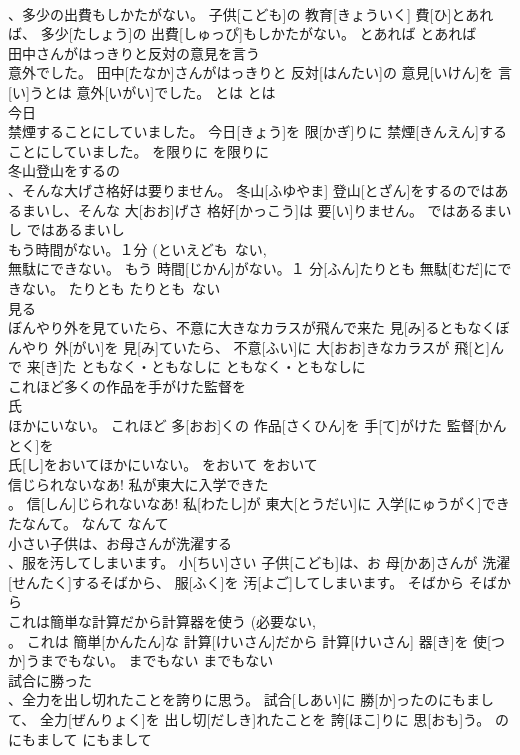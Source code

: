\documentclass[8pt]{extreport}
\begin{document}
\begin{CJK}{UTF8}{min}
\\	、多少の出費もしかたがない。	子供[こども]の 教育[きょういく] 費[ひ]とあれば、 多少[たしょう]の 出費[しゅっぴ]もしかたがない。	とあれば	とあれば	
\\	田中さんがはっきりと反対の意見を言う 
\\	意外でした。	田中[たなか]さんがはっきりと 反対[はんたい]の 意見[いけん]を 言[い]うとは 意外[いがい]でした。	とは	とは	
\\	今日 
\\	禁煙することにしていました。	今日[きょう]を 限[かぎ]りに 禁煙[きんえん]することにしていました。	を限りに	を限りに	
\\	冬山登山をするの 
\\	、そんな大げさ格好は要りません。	冬山[ふゆやま] 登山[とざん]をするのではあるまいし、そんな 大[おお]げさ 格好[かっこう]は 要[い]りません。	ではあるまいし	ではあるまいし	
\\	もう時間がない。１分 (といえども~ない, 
\\	無駄にできない。	もう 時間[じかん]がない。１ 分[ふん]たりとも 無駄[むだ]にできない。	たりとも	たりとも~ない	
\\	見る 
\\	ぼんやり外を見ていたら、不意に大きなカラスが飛んで来た	見[み]るともなくぼんやり 外[がい]を 見[み]ていたら、 不意[ふい]に 大[おお]きなカラスが 飛[と]んで 来[き]た	ともなく・ともなしに	ともなく・ともなしに	
\\	これほど多くの作品を手がけた監督を
\\	氏 
\\	ほかにいない。	これほど 多[おお]くの 作品[さくひん]を 手[て]がけた 監督[かんとく]を 
\\	氏[し]をおいてほかにいない。	をおいて	をおいて	
\\	信じられないなあ! 私が東大に入学できた 
\\	。	信[しん]じられないなあ! 私[わたし]が 東大[とうだい]に 入学[にゅうがく]できたなんて。	なんて	なんて	
\\	小さい子供は、お母さんが洗濯する 
\\	、服を汚してしまいます。	小[ちい]さい 子供[こども]は、お 母[かあ]さんが 洗濯[せんたく]するそばから、 服[ふく]を 汚[よご]してしまいます。	そばから	そばから	
\\	これは簡単な計算だから計算器を使う (必要ない, 
\\	。	これは 簡単[かんたん]な 計算[けいさん]だから 計算[けいさん] 器[き]を 使[つか]うまでもない。	までもない	までもない	
\\	試合に勝った
\\	、全力を出し切れたことを誇りに思う。	試合[しあい]に 勝[か]ったのにもまして、 全力[ぜんりょく]を 出し切[だしき]れたことを 誇[ほこ]りに 思[おも]う。	のにもまして	にもまして	

\end{CJK}
\end{document}
